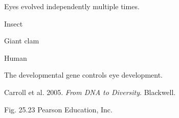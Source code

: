 \documentclass[t]{beamer}
\begin{document}
%
{
\begin{frame}[b]

\end{frame}
}
%
{
\begin{frame}{Eyes evolved independently multiple times.}

\begin{minipage}{0.27\textwidth}
	
	\flushright
	\vspace{2em}
	\hangpara Insect
	
	\vspace{5em}
	
	\hangpara Giant clam	
	\vspace{5em}
	
	\hangpara Human
	
\end{minipage}
\end{frame}
}
%
{
\begin{frame}[t]{The  developmental gene controls eye development.}

	\vfilll
	
	\tiny Carroll et al. 2005. \textit{From DNA to Diversity}. Blackwell.
\end{frame}
}
%
{
\begin{frame}[b]

	\tiny Fig. 25.23 \textcopyright Pearson Education, Inc.
\end{frame}
}
%
\end{document}
